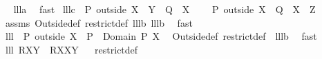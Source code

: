 \begin{isabellebody}
\isadelimproof
\ %
\endisadelimproof
%
\isatagproof
{}\isamarkupfalse%
\ lll{}{}a\ \isamarkupfalse%
\ fast%
\endisatagproof
{\isafoldproof}%
%
\isadelimproof
%
\endisadelimproof
\isanewline
\isanewline
{}\isamarkupfalse%
\ lll{}{}c{\isacharcolon}\ \ {\isachardoublequoteopen}{\isacharparenleft}P\ outside\ {\isacharparenleft}X\ {\isasymunion}\ Y{\isacharparenright}{\isacharparenright}\ {\isasyminter}\ {\isacharparenleft}Q\ {\isacharbar}{\isacharbar}\ {\isacharparenleft}X{\isacharparenright}{\isacharparenright}\ {\isacharequal}\ {\isacharbraceleft}{\isacharbraceright}\ {\isacharampersand}\ \isanewline
{\isacharparenleft}P\ outside\ {\isacharparenleft}X{\isacharparenright}{\isacharparenright}\ {\isasyminter}\ {\isacharparenleft}Q\ {\isacharbar}{\isacharbar}\ {\isacharparenleft}X\ {\isasyminter}\ Z{\isacharparenright}{\isacharparenright}\ {\isacharequal}\ {\isacharbraceleft}{\isacharbraceright}\isanewline
{\isachardoublequoteclose}%
\isadelimproof
\ %
\endisadelimproof
%
\isatagproof
{}\isamarkupfalse%
\ assms\ Outside{\isacharunderscore}def\ restrict{\isacharunderscore}def\ lll{}{}b\ lll{}{}b\ \isamarkupfalse%
\ fast%
\endisatagproof
{\isafoldproof}%
%
\isadelimproof
%
\endisadelimproof
\isanewline
\isanewline
{}\isamarkupfalse%
\ lll{}{}{\isacharcolon}\ \ {\isachardoublequoteopen}P\ outside\ X\ {\isacharequal}\ P\ {\isacharbar}{\isacharbar}\ {\isacharparenleft}Domain\ P\ {\isacharminus}X{\isacharparenright}{\isachardoublequoteclose}\ \isanewline
%
\isadelimproof
%
\endisadelimproof
%
\isatagproof
{}\isamarkupfalse%
\ Outside{\isacharunderscore}def\ restrict{\isacharunderscore}def\ \ lll{}{}b\ \isamarkupfalse%
\ fast%
\endisatagproof
{\isafoldproof}%
%
\isadelimproof
\isanewline
%
\endisadelimproof
\isanewline
{}\isamarkupfalse%
\ lll{}{}{\isacharcolon}\ {\isachardoublequoteopen}R{\isacharbackquote}{\isacharbackquote}{\isacharparenleft}X{\isacharminus}Y{\isacharparenright}\ {\isacharequal}\ {\isacharparenleft}R{\isacharbar}{\isacharbar}X{\isacharparenright}{\isacharbackquote}{\isacharbackquote}{\isacharparenleft}X{\isacharminus}Y{\isacharparenright}{\isachardoublequoteclose}%
\isadelimproof
\ %
\endisadelimproof
%
\isatagproof
{}\isamarkupfalse%
\ restrict{\isacharunderscore}def\ \isamarkupfalse%

\end{isabellebody}
